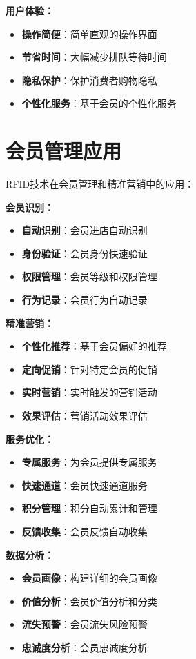 \documentclass[12pt,UTF8]{ctexbook}
\begin{document}
\begin{itemize}[leftmargin=3.5em]
\begin{itemize}[leftmargin=3.5em]
\begin{itemize}[leftmargin=3.5em]
\textbf{用户体验：}
\begin{itemize}[leftmargin=3.5em]
    \item \textbf{操作简便}：简单直观的操作界面
    \item \textbf{节省时间}：大幅减少排队等待时间
    \item \textbf{隐私保护}：保护消费者购物隐私
    \item \textbf{个性化服务}：基于会员的个性化服务
\end{itemize}

\section{会员管理应用}

RFID技术在会员管理和精准营销中的应用：

\textbf{会员识别：}
\begin{itemize}[leftmargin=3.5em]
    \item \textbf{自动识别}：会员进店自动识别
    \item \textbf{身份验证}：会员身份快速验证
    \item \textbf{权限管理}：会员等级和权限管理
    \item \textbf{行为记录}：会员行为自动记录
\end{itemize}

\textbf{精准营销：}
\begin{itemize}[leftmargin=3.5em]
    \item \textbf{个性化推荐}：基于会员偏好的推荐
    \item \textbf{定向促销}：针对特定会员的促销
    \item \textbf{实时营销}：实时触发的营销活动
    \item \textbf{效果评估}：营销活动效果评估
\end{itemize}

\textbf{服务优化：}
\begin{itemize}[leftmargin=3.5em]
    \item \textbf{专属服务}：为会员提供专属服务
    \item \textbf{快速通道}：会员快速通道服务
    \item \textbf{积分管理}：积分自动累计和管理
    \item \textbf{反馈收集}：会员反馈自动收集
\end{itemize}

\textbf{数据分析：}
\begin{itemize}[leftmargin=3.5em]
    \item \textbf{会员画像}：构建详细的会员画像
    \item \textbf{价值分析}：会员价值分析和分类
    \item \textbf{流失预警}：会员流失风险预警
    \item \textbf{忠诚度分析}：会员忠诚度分析


\end{itemize}
\end{itemize}
\end{itemize}
\end{itemize}
\end{document}
